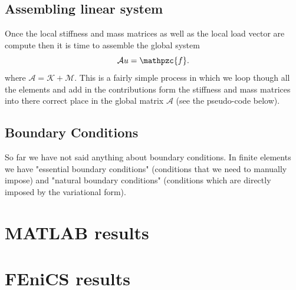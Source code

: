 \documentclass[14pt]{extarticle}
\numberwithin{equation}{section}    %
\begin{document}
\subsection{Assembling linear system}

Once the local stiffness and mass matrices as well as the local load vector are compute then it is time to assemble the global system $$\mathcal{A} u = \mathpzc{f}.$$
where $\mathcal{A} = \mathcal{K}+\mathcal{M}$. This is a fairly simple process in which we loop though all the elements and add in the contributions form the stiffness and mass matrices into there correct place in the global matrix $\mathcal{A}$  (see the pseudo-code below).

\noindent{}

\subsection{Boundary Conditions}

So far we have not said anything about boundary conditions. In finite elements we have "essential boundary conditions" (conditions that we need to manually impose) and "natural boundary conditions" (conditions which are directly imposed by the variational form).



\section{MATLAB results}


\section{FEniCS results}
\end{document}
